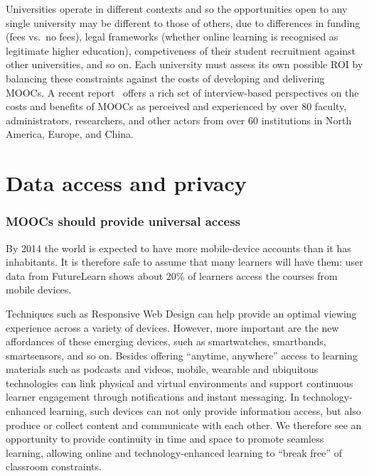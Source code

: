 \documentclass[a4paper,UKenglish]{dagman}
\begin{document}
Universities operate in different contexts and so the opportunities open to any single university
may be different to those of others, due to differences in funding (fees vs.\ no fees), legal
frameworks (whether online learning is recognised as legitimate higher education), competiveness of
their student recruitment against other universities, and so on.  Each university must assess its
own possible ROI by balancing these constraints against the costs of developing and delivering
MOOCs.  A recent report~\cite{moocs-expectations-and-reality} offers a rich set of interview-based
perspectives on the costs and benefits of MOOCs as perceived and experienced by over 80 faculty,
administrators, researchers, and other actors from over 60 institutions in North America, Europe,
and China.

\section{Data access and privacy}

\subsubsection*{MOOCs should provide universal access}
By 2014 the world is expected to have more mobile-device accounts than it has inhabitants.  It is
therefore safe to assume that many learners will have them: user data from FutureLearn shows about
20\% of learners access the courses from mobile devices. 

Techniques such as Responsive Web Design can help provide an optimal viewing experience across a
variety of devices.  However, more important are the new affordances of these emerging devices, such
as smartwatches, smartbands, smartsensors, and so on.  Besides offering ``anytime, anywhere'' access
to learning materials such as podcasts and videos, mobile, wearable and ubiquitous technologies can
link physical and virtual environments and support continuous learner engagement through
notifications and instant messaging. In technology-enhanced learning, such devices can not only
provide information access, but also produce or collect content and communicate with each other.  We
therefore see an opportunity to provide continuity in time and space to promote seamless learning,
allowing online and technology-enhanced learning to ``break free'' of classroom constraints.
\end{document}
